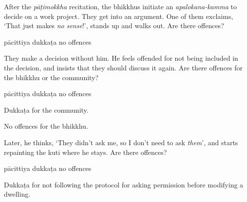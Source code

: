 \begin{exam}{\autoExamName}
  \begin{problem*}

    \begin{parts}

      \item After the \textit{pāṭimokkha} recitation, the bhikkhus initiate an
      \emph{apalokana-kamma} to decide on a work project. They get into an
      argument. One of them exclaims, `That just makes \textit{no sense}!',
      stands up and walks out. Are there offences?

      \bigskip

      \begin{answers}{3}
        \bChoices
         pācittiya\eAns
         dukkaṭa\eAns
         no offences\eAns
        \eChoices
      \end{answers}

      \clearpage

    \item They make a decision without him. He feels offended for not being
      included in the decision, and insists that they should discuss it again.
      Are there offences for the bhikkhu or the community?

      \bigskip

      \begin{answers}{3}
        \bChoices
         pācittiya\eAns
         dukkaṭa\eAns
         no offences\eAns
        \eChoices
      \end{answers}

      \begin{solution}
        Dukkaṭa for the community.

        No offences for the bhikkhu.
      \end{solution}

      \bigskip
  
    \item Later, he thinks, `They didn't ask me, so I don't need to ask
      \textit{them}', and starts repainting the kuti where he stays.
      Are there offences?

      \bigskip

      \begin{answers}{3}
        \bChoices
         pācittiya\eAns
         dukkaṭa\eAns
         no offences\eAns
        \eChoices
      \end{answers}

      \begin{solution}
        Dukkaṭa for not following the protocol for asking permission before
        modifying a dwelling.
      \end{solution}

    \end{parts}

  \end{problem*}

\end{exam}
